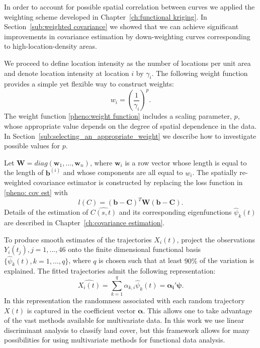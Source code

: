 In order to account for possible spatial correlation between curves we applied the weighting scheme developed in Chapter~\ref{ch:functional kriging}. In Section~\ref{sub:weighted covariance} we showed that we can achieve significant improvements in covariance estimation by down-weighting curves corresponding to high-location-density areas.

We proceed to define location intensity as the number of locations per unit area and denote location intensity at location $i$ by $\gamma_i$.  The following weight function provides a simple yet flexible way to construct weights:
\begin{equation}
	w_i = \left(\frac{1}{\gamma_i}\right)^p. \label{pheno:weight function}
\end{equation}
The weight function \eqref{pheno:weight function} includes a scaling parameter, $p$, whose appropriate value depends on the degree of spatial dependence in the data. In Section~\ref{sub:selecting_an_appropriate_weight} we describe how to investigate possible values for $p$.


Let $\mathbf{W} = diag(\mathbf{w}_1, \dots, \mathbf{w}_n)$, where $\mathbf{w}_i$ is a row vector whose length is equal to the length of $\mathbf{b}^{(i)}$ and whose components are all equal to $w_i$. The spatially re-weighted covariance estimator is constructed by replacing the loss function in \ref{pheno: cov est} with 
\begin{equation}
	l(C)= (\mathbf{b} - \mathbf{C})^T\mathbf{W}(\mathbf{b} - \mathbf{C}). \label{pheno:diag weighted loss function} 
\end{equation}
Details of the estimation of $\widehat{C(s,t)}$ and its corresponding eigenfunctions $\hat{\psi}_k(t)$ are described in Chapter~\ref{ch:covariance estimation}. 

To produce smooth estimates of the trajectories $X_i(t)$, project the observations $Y_i(t_j), j = 1, \dots, 46$ onto the finite dimensional functional basis $\{\hat{\psi}_k(t), k = 1, \dots, q\}$, where $q$ is chosen such that at least $90\%$ of the variation is explained. The fitted trajectories admit the following representation:
\begin{equation}
	\widehat{X_i(t)} = \sum_{k=1}^q\alpha_{k,i} \hat{\psi}_k(t) = \boldsymbol{\alpha_i'}\boldsymbol{\psi}.
	\label{phen:coef}
\end{equation}
In this representation the randomness associated with each random trajectory $X(t)$ is captured in the coefficient vector $\boldsymbol{\alpha}$. This allows one to take advantage of the vast methods available for multivariate data. In this work we use linear discriminant analysis to classify land cover, but this framework allows for many possibilities for using multivariate methods for functional data analysis. 
